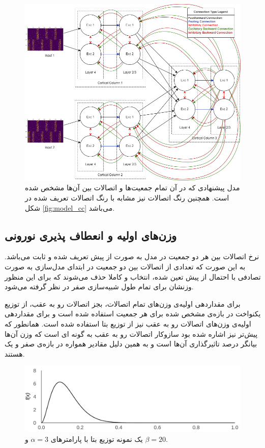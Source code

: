 \documentclass[12pt]{report}
\begin{document}
	\begin{figure}[]
		\centering
		\includegraphics[width=1.0\linewidth]{model_overall.png}
		\caption[NS]{
			مدل پیشنهادی که در آن تمام جمعیت‌ها و اتصالات بین آن‌ها مشخص شده است. همچنین رنگ اتصالات نیز مشابه با رنگ اتصالات تعریف شده در شکل \ref{fig:model_cc} می‌باشد.
		}
		\label{fig:model_overall} 
	\end{figure}

	\subsection{وزن‌های اولیه و انعطاف پذیری نورونی}
	نرخ اتصالات بین هر دو جمعیت در مدل به صورت از پیش تعریف شده و ثابت می‌باشد. به این صورت که تعدادی از اتصالات بین دو جمعیت در ابتدای مدل‌سازی به صورت تصادفی با احتمال از پیش تعین شده، انتخاب و کاملا حذف می‌شوند که برای این منظور وزنشان برای تمام طول شبیه‌سازی صفر در نظر گرفته می‌شود.
	
	برای مقداردهی اولیه‌ی وزن‌های تمام اتصالات، بجز اتصالات رو به عقب، از توزیع یکنواخت در بازه‌ی مشخص شده برای هر جمعیت استفاده شده است و برای مقداردهی اولیه‌ی وزن‌های اتصالات رو به عقب نیز از توزیع بتا استفاده شده است. همانطور که پیش‌تر نیز اشاره شده بود سازوکار اتصالات رو به عقب به گونه ای است که وزن آن‌ها بیانگر درصد تاثیرگذاری آن‌ها است و به همین دلیل مقادیر همواره در بازه‌ی صفر و یک هستند.
	
	\begin{figure}[]
		\centering
		\includegraphics[width=0.8\linewidth]{beta-3-20.png}
		\caption[NS]{
			یک نمونه توزیع بتا با پارامتر‌های $\alpha=3$ و $\beta=20$.
		}
		\label{fig:beta} 
	\end{figure}
	
\end{document}

